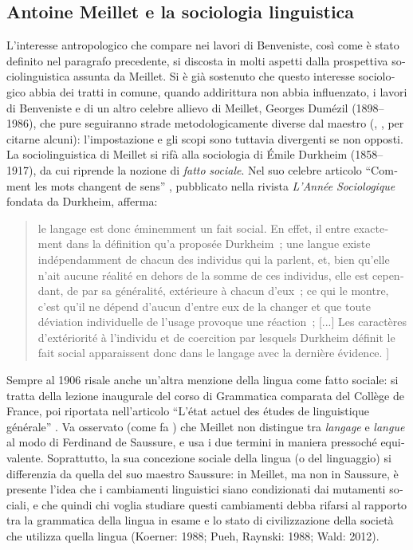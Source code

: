 \documentclass[output=paper]{../langscibook}
\begin{document}
\begin{otherlanguage}{italian}
\subsection{Antoine Meillet e la sociologia linguistica}

L’interesse antropologico che compare nei lavori di Benveniste, così come è stato definito nel paragrafo precedente, si discosta in molti aspetti dalla prospettiva sociolinguistica assunta da Meillet. Si è già sostenuto che questo interesse sociologico abbia dei tratti in comune, quando addirittura non abbia influenzato, i lavori di Benveniste e di un altro celebre allievo di Meillet, Georges Dumézil (1898--1986), che pure seguiranno strade metodologicamente diverse dal maestro (\citealt{monod-becquelin_meillet_1988}, \citealt{lincoln_oaths_2012}, per citarne alcuni): l’impostazione e gli scopi sono tuttavia divergenti se non opposti. La sociolinguistica di Meillet si rifà alla sociologia di Émile Durkheim (1858--1917), da cui riprende la nozione di \textit{fatto} \textit{sociale}. Nel suo celebre articolo “Comment les mots changent de sens” \citep{Meillet1906a}, pubblicato nella rivista \textit{L’Année} \textit{Sociologique} fondata da Durkheim, afferma:
 
\begin{quote}
    le langage est donc éminemment un fait social. En effet, il entre exactement dans la définition qu’a proposée Durkheim~; une langue existe indépendamment de chacun des individus qui la parlent, et, bien qu’elle n’ait aucune réalité en dehors de la somme de ces individus, elle est cependant, de par sa généralité, extérieure à chacun d’eux~; ce qui le montre, c’est qu’il ne dépend d’aucun d’entre eux de la changer et que toute déviation individuelle de l’usage provoque une réaction~; [...{]} Les caractères d’extériorité à l’individu et de coercition par lesquels Durkheim définit le fait social apparaissent donc dans le langage avec la dernière évidence. \citep[230]{Meillet1906a}]
\end{quote}

Sempre al 1906 risale anche un’altra menzione della lingua come fatto sociale: si tratta della lezione inaugurale del corso di Grammatica comparata del Collège de France, poi riportata nell’articolo “L’état actuel des études de linguistique générale” \citep{Meillet1906b}. Va osservato (come fa \citealt[68]{Koerner1988}) che Meillet non distingue tra \textit{langage} e \textit{langue} al modo di Ferdinand de Saussure, e usa i due termini in maniera pressoché equivalente. Soprattutto, la sua concezione sociale della lingua (o del linguaggio) si differenzia da quella del suo maestro Saussure: in Meillet, ma non in Saussure, è presente l’idea che i cambiamenti linguistici siano condizionati dai mutamenti sociali, e che quindi chi voglia studiare questi cambiamenti debba rifarsi al rapporto tra la grammatica della lingua in esame e lo stato di civilizzazione della società che utilizza quella lingua (Koerner: 1988; Pueh, Raynski: 1988; Wald: 2012).


\end{otherlanguage}
\end{document}
